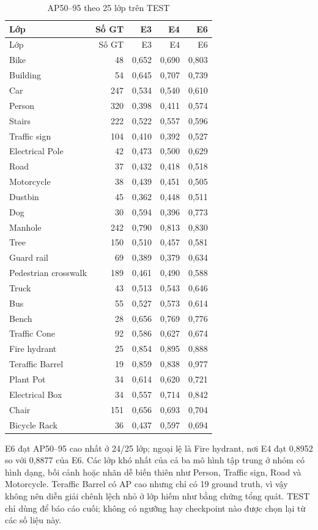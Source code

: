 \documentclass[12pt,a4paper,oneside]{report}
\begin{document}
\begin{longtable}{lrrrr}
\caption{AP50--95 theo 25 lớp trên TEST}\label{tab:testperclass}\\
\toprule Lớp & Số GT & E3 & E4 & E6\\\midrule
\endfirsthead
\toprule Lớp & Số GT & E3 & E4 & E6\\\midrule
\endhead
Bike & 48 & 0,652 & 0,690 & 0,803\\
Building & 54 & 0,645 & 0,707 & 0,739\\
Car & 247 & 0,534 & 0,540 & 0,610\\
Person & 320 & 0,398 & 0,411 & 0,574\\
Stairs & 222 & 0,522 & 0,557 & 0,596\\
Traffic sign & 104 & 0,410 & 0,392 & 0,527\\
Electrical Pole & 42 & 0,473 & 0,500 & 0,629\\
Road & 37 & 0,432 & 0,418 & 0,518\\
Motorcycle & 38 & 0,439 & 0,451 & 0,505\\
Dustbin & 45 & 0,362 & 0,448 & 0,511\\
Dog & 30 & 0,594 & 0,396 & 0,773\\
Manhole & 242 & 0,790 & 0,813 & 0,830\\
Tree & 150 & 0,510 & 0,457 & 0,581\\
Guard rail & 69 & 0,389 & 0,379 & 0,634\\
Pedestrian crosswalk & 189 & 0,461 & 0,490 & 0,588\\
Truck & 43 & 0,513 & 0,543 & 0,646\\
Bus & 55 & 0,527 & 0,573 & 0,614\\
Bench & 28 & 0,656 & 0,769 & 0,776\\
Traffic Cone & 92 & 0,586 & 0,627 & 0,674\\
Fire hydrant & 25 & 0,854 & 0,895 & 0,888\\
Teraffic Barrel & 19 & 0,859 & 0,838 & 0,977\\
Plant Pot & 34 & 0,614 & 0,620 & 0,721\\
Electrical Box & 34 & 0,557 & 0,714 & 0,842\\
Chair & 151 & 0,656 & 0,693 & 0,704\\
Bicycle Rack & 36 & 0,437 & 0,597 & 0,694\\
\bottomrule
\end{longtable}

E6 đạt AP50--95 cao nhất ở 24/25 lớp; ngoại lệ là Fire hydrant, nơi E4 đạt 0,8952 so với 0,8877 của E6. Các lớp khó nhất của cả ba mô hình tập trung ở nhóm có hình dạng, bối cảnh hoặc nhãn dễ biến thiên như Person, Traffic sign, Road và Motorcycle. Teraffic Barrel có AP cao nhưng chỉ có 19 ground truth, vì vậy không nên diễn giải chênh lệch nhỏ ở lớp hiếm như bằng chứng tổng quát. TEST chỉ dùng để báo cáo cuối; không có ngưỡng hay checkpoint nào được chọn lại từ các số liệu này.
\end{document}
